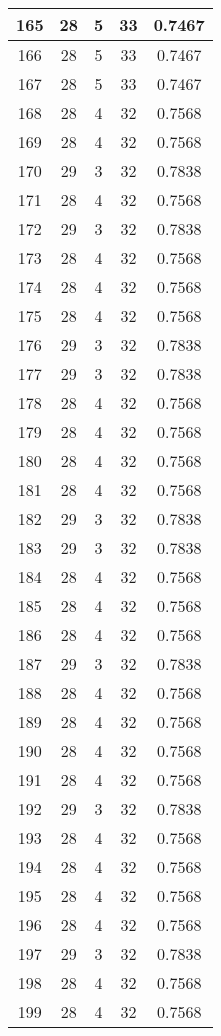 \documentclass[letterpaper, 12pt]{article}
\begin{document}
\begin{longtable}{|c|c|c|c|c|}
\hline
165 & 28 & 5 & 33 & 0.7467 \\
\hline
166 & 28 & 5 & 33 & 0.7467 \\
\hline
167 & 28 & 5 & 33 & 0.7467 \\
\hline
168 & 28 & 4 & 32 & 0.7568 \\
\hline
169 & 28 & 4 & 32 & 0.7568 \\
\hline
170 & 29 & 3 & 32 & 0.7838 \\
\hline
171 & 28 & 4 & 32 & 0.7568 \\
\hline
172 & 29 & 3 & 32 & 0.7838 \\
\hline
173 & 28 & 4 & 32 & 0.7568 \\
\hline
174 & 28 & 4 & 32 & 0.7568 \\
\hline
175 & 28 & 4 & 32 & 0.7568 \\
\hline
176 & 29 & 3 & 32 & 0.7838 \\
\hline
177 & 29 & 3 & 32 & 0.7838 \\
\hline
178 & 28 & 4 & 32 & 0.7568 \\
\hline
179 & 28 & 4 & 32 & 0.7568 \\
\hline
180 & 28 & 4 & 32 & 0.7568 \\
\hline
181 & 28 & 4 & 32 & 0.7568 \\
\hline
182 & 29 & 3 & 32 & 0.7838 \\
\hline
183 & 29 & 3 & 32 & 0.7838 \\
\hline
184 & 28 & 4 & 32 & 0.7568 \\
\hline
185 & 28 & 4 & 32 & 0.7568 \\
\hline
186 & 28 & 4 & 32 & 0.7568 \\
\hline
187 & 29 & 3 & 32 & 0.7838 \\
\hline
188 & 28 & 4 & 32 & 0.7568 \\
\hline
189 & 28 & 4 & 32 & 0.7568 \\
\hline
190 & 28 & 4 & 32 & 0.7568 \\
\hline
191 & 28 & 4 & 32 & 0.7568 \\
\hline
192 & 29 & 3 & 32 & 0.7838 \\
\hline
193 & 28 & 4 & 32 & 0.7568 \\
\hline
194 & 28 & 4 & 32 & 0.7568 \\
\hline
195 & 28 & 4 & 32 & 0.7568 \\
\hline
196 & 28 & 4 & 32 & 0.7568 \\
\hline
197 & 29 & 3 & 32 & 0.7838 \\
\hline
198 & 28 & 4 & 32 & 0.7568 \\
\hline
199 & 28 & 4 & 32 & 0.7568 \\
\hline
\end{longtable}
\end{document}
